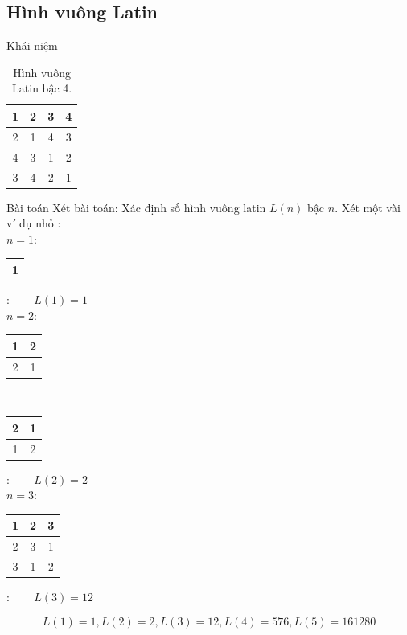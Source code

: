 \documentclass[notheorems,hyperref={bookmarks=true}]{beamer}
\theoremstyle{plain}
\begin{document}
\begin{footnotesize}
\subsection{Hình vuông Latin}
\begin{frame}{Khái niệm}
\begin{table}[ht]
\centering
\begin{tabular}{|c|c|c|c|}
    \hline
     1&2&3&4  \\ \hline
     2&1&4&3  \\ \hline
     4&3&1&2  \\ \hline
     3&4&2&1  \\
     \hline
\end{tabular}
\caption{Hình vuông Latin bậc 4.}
\end{table}
\end{frame}

\begin{frame}{Bài toán}
Xét bài toán: Xác định số hình vuông latin $L(n)$ bậc $n$. Xét một vài ví dụ nhỏ :\\
$n=1$:
\begin{tabular}{|c|}
    \hline
     1 \\ \hline
    
\end{tabular}: ~~~ $L(1) = 1$
\vspace{20pt}
\\
$n=2$:
\begin{tabular}{|c|c|}
    \hline
     1&2 \\ \hline
     2&1 \\ 
     \hline
\end{tabular} ~~~~~~~~
\begin{tabular}{|c|c|}
    \hline
     2&1 \\ \hline
     1&2 \\ 
     \hline
\end{tabular}: ~~~ $L(2) = 2$
\vspace{20pt}
\\
$n=3$:
\begin{tabular}{|c|c|c|}
	\hline
	1&2&3 \\ \hline
	2&3&1 \\ \hline
	3&1&2 \\
	\hline
\end{tabular}: ~~~ $L(3) = 12$

\begin{equation*}
L(1) = 1, L(2) = 2, L(3) = 12, L(4) = 576, L(5) = 161280
\end{equation*}
\end{frame}


\end{footnotesize}
\end{document}
